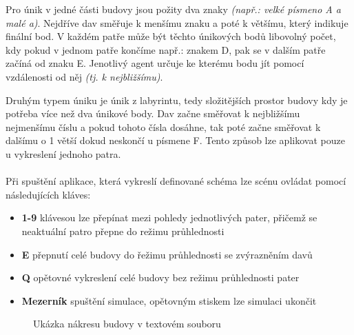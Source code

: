 \documentclass[czech,public,dept460,male,cpdeclaration]{diploma}
\begin{document}
Pro únik v jedné části budovy jsou požity dva znaky \textit{(např.: velké  písmeno A a malé a)}. Nejdříve dav směřuje k menšímu znaku a poté k většímu, který indikuje finální bod. V každém patře může být těchto únikových bodů libovolný počet, kdy pokud v jednom patře končíme např.: znakem D, pak se v dalším patře začíná od znaku E. Jenotlivý agent určuje ke kterému bodu jít pomocí vzdálenosti od něj \textit{(tj. k nejbližšímu)}.

Druhým typem úniku je únik z labyrintu, tedy složitějších prostor budovy kdy je potřeba více než dva únikové body. Dav začne směřovat k nejbližšímu nejmenšímu číslu a pokud tohoto čísla dosáhne, tak poté začne směřovat k dalšímu o 1 větší dokud neskončí u písmene F. Tento způsob lze aplikovat pouze u vykreslení jednoho patra. 
\\\\
Při spuštění aplikace, která vykreslí definované schéma lze scénu ovládat pomocí následujících kláves:

\begin{itemize}
	\item \textbf{1-9} klávesou lze přepínat mezi pohledy jednotlivých pater, přičemž se neaktuální patro přepne do režimu průhlednosti
	\item \textbf{E} přepnutí celé budovy do řežimu průhlednosti se zvýrazněním davů
	\item \textbf{Q} opětovné vykreslení celé budovy bez režimu průhlednosti pater
	\item \textbf{Mezerník} spuštění simulace, opětovným stiskem lze simulaci ukončit
\end{itemize}

\begin{figure}[H]
	\centering
	\hfill
	\caption{Ukázka nákresu budovy v textovém souboru} \label{fig:mapatxt}
\end{figure}
\end{document}
